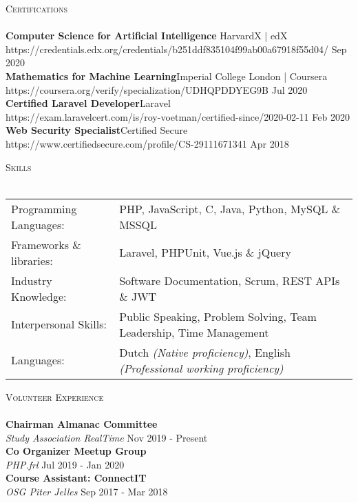 \documentclass[a4paper]{article}
\newcommand{\lineunder} {
    \vspace*{-8pt} \\
    \hspace*{-18pt} \hrulefill \\
}
\newcommand{\header} [1] {
    {\hspace*{-18pt}\vspace*{6pt} \textsc{#1}}
    \vspace*{-6pt} \lineunder
}
\begin{document}
\header{Certifications}
\textbf{Computer Science for Artificial Intelligence }\hfill HarvardX | edX\\
https://credentials.edx.org/credentials/b251ddf835104f99ab00a67918f55d04/ \hfill Sep 2020\\
\vspace{2mm}
\textbf{Mathematics for Machine Learning}\hfill Imperial College London | Coursera\\
https://coursera.org/verify/specialization/UDHQPDDYEG9B \hfill Jul 2020\\
\vspace{2mm}
\textbf{Certified Laravel Developer}\hfill Laravel\\
https://exam.laravelcert.com/is/roy-voetman/certified-since/2020-02-11 \hfill Feb 2020\\
\vspace{2mm}
\textbf{Web Security Specialist}\hfill Certified Secure\\
https://www.certifiedsecure.com/profile/CS-29111671341 \hfill Apr 2018\\
\vspace{2mm}

\vspace{5mm}

\header{Skills}
\vspace{2mm}
\begin{tabular}{l l}
	Programming Languages:   & PHP, JavaScript, C, Java, Python, MySQL \& MSSQL                     \\
    Frameworks \& libraries: & Laravel, PHPUnit, Vue.js \& jQuery                                   \\
	Industry Knowledge:      & Software Documentation, Scrum, REST APIs \& JWT    \\
	Interpersonal Skills:    & Public Speaking, Problem Solving, Team Leadership, Time Management \\
    Languages:               & Dutch \emph{(Native proficiency)}, English \emph{(Professional working proficiency)}\\
\end{tabular}
\vspace{2mm}

\vspace{5mm}

\header{Volunteer Experience}
\vspace{1mm}
\textbf{Chairman Almanac Committee} \hfill\\
\textit{Study Association RealTime} \hfill Nov 2019 - Present\\
\vspace{2mm}
\textbf{Co Organizer Meetup Group} \hfill\\
\textit{PHP.frl} \hfill Jul 2019 - Jan 2020\\
\vspace{2mm}
\textbf{Course Assistant: ConnectIT} \hfill\\
\textit{OSG Piter Jelles} \hfill Sep 2017 - Mar 2018\\
\vspace{2mm}
\end{document}
